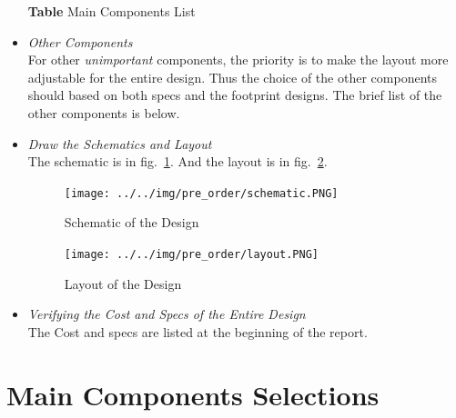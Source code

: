 \documentclass[]{article}
\begin{document}
\begin{itemize}
            \begin{center}
                \textbf{Table} Main Components List 
            \end{center}

        \item \textit{Other Components} \\
            For other \textit{unimportant} components, the priority is to make
            the layout more adjustable for the entire design. Thus the choice of
            the other components should based on both specs and the footprint
            designs. The brief list of the other components is below.

        \item \textit{Draw the Schematics and Layout} \\
            The schematic is in fig.~\ref{schematic}. And the layout is in
            fig.~\ref{layout}.
            \begin{figure}[p]
                \begin{center}
                    \texttt{[image: ../../img/pre\_order/schematic.PNG]}~
                    \label{schematic}
                    \caption{Schematic of the Design}
                \end{center}
            \end{figure}

            \begin{figure}[p]
                \begin{center}
                    \texttt{[image: ../../img/pre\_order/layout.PNG]}~
                    \label{layout}
                    \caption{Layout of the Design}
                \end{center}
            \end{figure}
            
        \item \textit{Verifying the Cost and Specs of the Entire Design} \\
            The Cost and specs are listed at the beginning of the report.

    \end{itemize}

\section{Main Components Selections}
\end{document}
